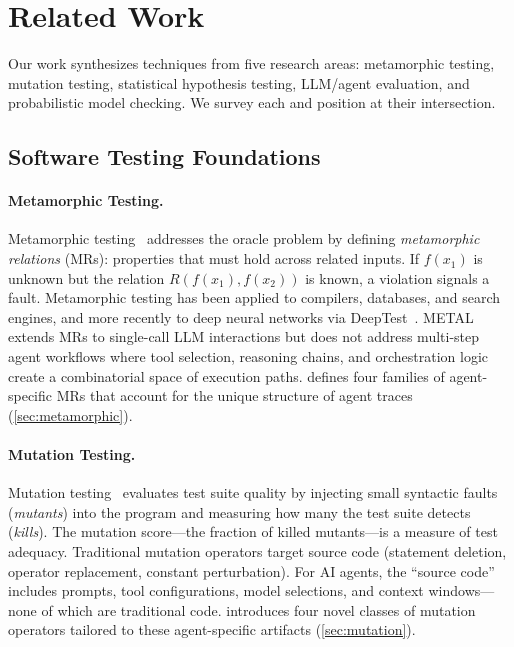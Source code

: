 
\section{Related Work}
\label{sec:related}

Our work synthesizes techniques from five research areas: metamorphic
testing, mutation testing, statistical hypothesis testing, LLM/agent
evaluation, and probabilistic model checking. We survey each and
position \agentassay{} at their intersection.

\subsection{Software Testing Foundations}
\label{sec:related:testing}

\paragraph{Metamorphic Testing.}
Metamorphic testing~\citep{chen2018metamorphic,segura2016survey} addresses
the oracle problem by defining \emph{metamorphic relations} (MRs):
properties that must hold across related inputs. If $f(x_1)$ is unknown
but the relation $R(f(x_1), f(x_2))$ is known, a violation signals a
fault. Metamorphic testing has been applied to compilers, databases, and
search engines, and more recently to deep neural networks via
DeepTest~\citep{tian2018deeptest}. METAL~\citep{deng2024metal} extends
MRs to single-call LLM interactions but does not address multi-step
agent workflows where tool selection, reasoning chains, and
orchestration logic create a combinatorial space of execution paths.
\agentassay{} defines four families of agent-specific MRs that account
for the unique structure of agent traces (\cref{sec:metamorphic}).

\paragraph{Mutation Testing.}
Mutation testing~\citep{jia2011mutation,demillo1978hints} evaluates test
suite quality by injecting small syntactic faults (\emph{mutants}) into
the program and measuring how many the test suite detects
(\emph{kills}). The mutation score---the fraction of killed mutants---is
a measure of test adequacy. Traditional mutation operators target source
code (statement deletion, operator replacement, constant perturbation).
For AI agents, the ``source code'' includes prompts, tool
configurations, model selections, and context windows---none of which are
traditional code. \agentassay{} introduces four novel classes of mutation
operators tailored to these agent-specific artifacts (\cref{sec:mutation}).

